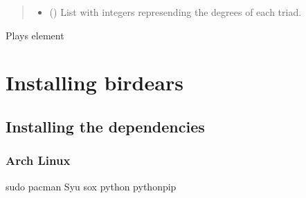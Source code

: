 \documentclass[letterpaper,10pt,english]{sphinxmanual}
\begin{document}
\begin{fulllineitems}
\begin{fulllineitems}
\begin{quote}
\begin{description}
\begin{itemize}
\item {} 
 () \textendash{} List with integers represending the degrees
of each triad.

\end{itemize}

\end{description}\end{quote}

\end{fulllineitems}


\begin{fulllineitems}
\label{\detokenize{birdears:birdears.sequence.Sequence.play}}
\end{fulllineitems}


\begin{fulllineitems}
\label{\detokenize{birdears:birdears.sequence.Sequence.play_element}}
Plays element 

\end{fulllineitems}


\end{fulllineitems}



\chapter{Installing birdears}
\label{\detokenize{index:installing-birdears}}

\section{Installing the dependencies}
\label{\detokenize{index:installing-the-dependencies}}

\subsection{Arch Linux}
\label{\detokenize{index:arch-linux}}
\begin{sphinxVerbatim}[commandchars=\\\{\}]
sudo pacman \PYGZhy{}Syu sox python python\PYGZhy{}pip
\end{sphinxVerbatim}
\end{document}
